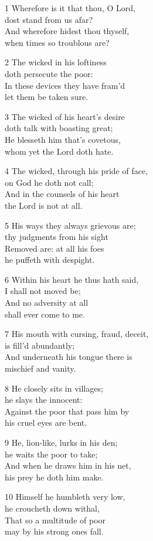 \begin{multicols}{3}
1 Wherefore is it that thou, O Lord,\\
dost stand from us afar?\\
And wherefore hidest thou thyself,\\
when times so troublous are?

2 The wicked in his loftiness\\
doth persecute the poor:\\
In these devices they have fram’d\\
let them be taken sure.

3 The wicked of his heart’s desire\\
doth talk with boasting great;\\
He blesseth him that’s covetous,\\
whom yet the Lord doth hate.

4 The wicked, through his pride of face,\\
on God he doth not call;\\
And in the counsels of his heart\\
the Lord is not at all.

5 His ways they always grievous are;\\
thy judgments from his sight\\
Removed are: at all his foes\\
he puffeth with despight.

6 Within his heart he thus hath said,\\
I shall not moved be;\\
And no adversity at all\\
shall ever come to me.

7 His mouth with cursing, fraud, deceit,\\
is fill’d abundantly;\\
And underneath his tongue there is\\
mischief and vanity.

8 He closely sits in villages;\\
he slays the innocent:\\
Against the poor that pass him by\\
his cruel eyes are bent.

9 He, lion-like, lurks in his den;\\
he waits the poor to take;\\
And when he draws him in his net,\\
his prey he doth him make.

10 Himself he humbleth very low,\\
he croucheth down withal,\\
That so a multitude of poor\\
may by his strong ones fall.


\end{multicols}
